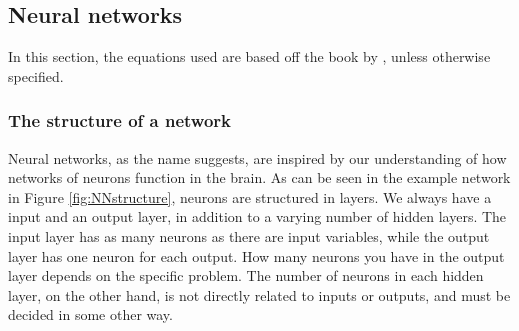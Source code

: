 \subsection{Neural networks}
In this section, the equations used are based off the book by \cite{Nielsen}, unless otherwise specified.
\subsubsection*{The structure of a network}
Neural networks, as the name suggests, are inspired by our understanding of how networks of neurons function in the brain. As can be seen in the example network in Figure \ref{fig:NNstructure}, neurons are structured in layers. We always have a input and an output layer, in addition to a varying number of hidden layers. The input layer has as many neurons as there are input variables, while the output layer has one neuron for each output. How many neurons you have in the output layer depends on the specific problem. The number of neurons in each hidden layer, on the other hand, is not directly related to inputs or outputs, and must be decided in some other way.


